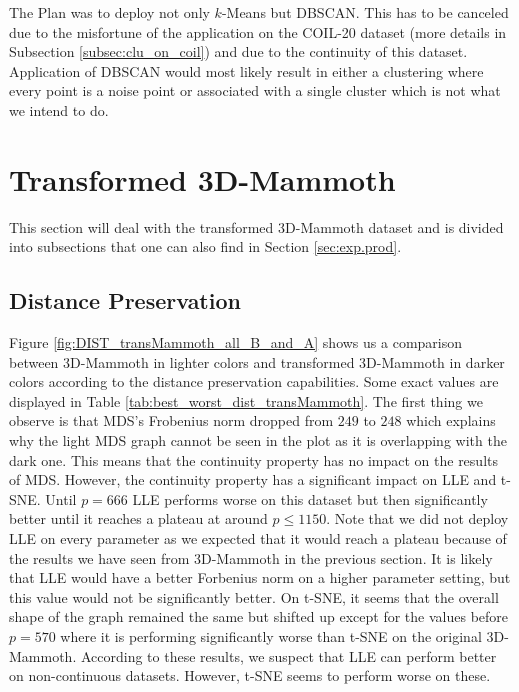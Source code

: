 The Plan was to deploy not only $k$-Means but DBSCAN. This has to be canceled due to the misfortune of the application on the COIL-20 dataset (more details in Subsection \ref{subsec:clu_on_coil}) and due to the continuity of this dataset. Application of DBSCAN would most likely result in either a clustering where every point is a noise point or associated with a single cluster which is not what we intend to do.

\newpage

\section{Transformed 3D-Mammoth}

This section will deal with the transformed 3D-Mammoth dataset and is divided into subsections that one can also find in Section \ref{sec:exp.prod}.

\subsection{Distance Preservation}

Figure \ref{fig:DIST_transMammoth_all_B_and_A} shows us a comparison between 3D-Mammoth in lighter colors and transformed 3D-Mammoth in darker colors according to the distance preservation capabilities. Some exact values are displayed in Table \ref{tab:best_worst_dist_transMammoth}. The first thing we observe is that MDS's Frobenius norm dropped from $249$ to $248$ which explains why the light MDS graph cannot be seen in the plot as it is overlapping with the dark one. This means that the continuity property has no impact on the results of MDS. However, the continuity property has a significant impact on LLE and t-SNE. Until $p=666$ LLE performs worse on this dataset but then significantly better until it reaches a plateau at around $p\leq 1150$. Note that we did not deploy LLE on every parameter as we expected that it would reach a plateau because of the results we have seen from 3D-Mammoth in the previous section. It is likely that LLE would have a better Forbenius norm on a higher parameter setting, but this value would not be significantly better. On t-SNE, it seems that the overall shape of the graph remained the same but shifted up except for the values before $p= 570$ where it is performing significantly worse than t-SNE on the original 3D-Mammoth. According to these results, we suspect that LLE can perform better on non-continuous datasets. However, t-SNE seems to perform worse on these.

